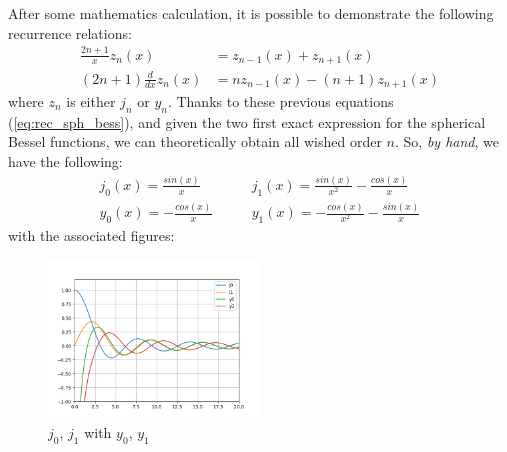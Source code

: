 \documentclass{article}
\numberwithin{equation}{section}
\begin{document}
After some mathematics calculation, it is possible to demonstrate the following recurrence relations:
\begin{align}\label{eq:rec_sph_bess}
\frac{2n+1}{x}z_{n}(x) &= z_{n-1}(x) + z_{n+1}(x)\\
(2n+1)\frac{d}{dx}z_{n}(x) &= nz_{n-1}(x) - (n+1)z_{n+1}(x)
\end{align}
where $z_{n}$ is either $j_{n}$ or $y_{n}$. Thanks to these previous equations (\ref{eq:rec_sph_bess}), and given the two first exact expression for the spherical Bessel functions, we can theoretically obtain all wished order $n$. So, \textit{by hand}, we have the following:
\begin{equation}
\begin{aligned}
j_{0}(x)=\frac{sin(x)}{x} \qquad &j_{1}(x)=\frac{sin(x)}{x^{2}} - \frac{cos(x)}{x}\\
y_{0}(x)=-\frac{cos(x)}{x} \qquad &y_{1}(x)=-\frac{cos(x)}{x^{2}}-\frac{sin(x)}{x}
\end{aligned}
\end{equation}
with the associated figures:
\begin{figure}[h]
    \centering
    \includegraphics[width=0.5\textwidth, height=0.5\textwidth]{jnyn.png}
    \caption{$j_{0}$, $j_{1}$ with $y_{0}$, $y_{1}$}
    \label{fig:jnyn}
\end{figure}
\end{document}

